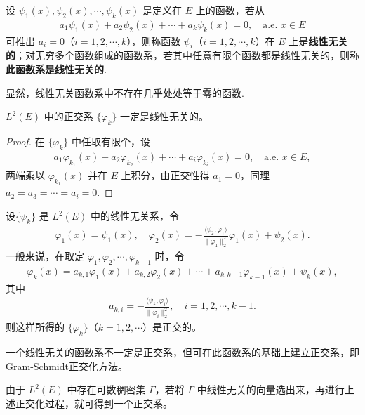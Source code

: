 \documentclass[../../main.tex]{subfiles}%
\begin{document}
\begin{definition}
设 $\psi_1(x), \psi_2(x), \cdots, \psi_k(x)$ 是定义在 $E$ 上的函数，若从
\begin{align*}
a_1 \psi_1(x) + a_2 \psi_2(x) + \cdots + a_k \psi_k(x) = 0, \quad \text{a.e. } x \in E
\end{align*}
可推出 $a_i = 0$（$i=1,2,\cdots,k$），则称函数 $\psi_i$（$i=1,2,\cdots,k$）在 $E$ 上是\textbf{线性无关的}；对无穷多个函数组成的函数系，若其中任意有限个函数都是线性无关的，则称\textbf{此函数系是线性无关的}.
\end{definition}
\begin{remark}
显然，线性无关函数系中不存在几乎处处等于零的函数.
\end{remark}

\begin{example}
$L^2(E)$ 中的正交系 $\{\varphi_k\}$ 一定是线性无关的。
\end{example}
\begin{proof}
在 $\{\varphi_k\}$ 中任取有限个，设
\begin{align*}
a_1 \varphi_{k_1}(x) + a_2 \varphi_{k_2}(x) + \cdots + a_i \varphi_{k_i}(x) = 0, \quad \text{a.e. } x \in E,
\end{align*}
两端乘以 $\varphi_{k_1}(x)$ 并在 $E$ 上积分，由正交性得 $a_1 = 0$，同理 $a_2 = a_3 = \cdots = a_i = 0$.
\end{proof}

\begin{theorem}
设$\{\psi_k\}$ 是 $L^2(E)$ 中的线性无关系，令
\begin{gather*}
\varphi_1(x) = \psi_1(x), \quad \varphi_2(x) = -\frac{\langle \psi_2, \varphi_1 \rangle}{\|\varphi_1\|_2^2} \varphi_1(x) + \psi_2(x).
\end{gather*}
一般来说，在取定 $\varphi_1, \varphi_2, \cdots, \varphi_{k-1}$ 时，令
\begin{gather*}
\varphi_k(x) = a_{k,1}\varphi_1(x) + a_{k,2}\varphi_2(x) + \cdots + a_{k,k-1}\varphi_{k-1}(x) + \psi_k(x),
\end{gather*}
其中
\begin{align*}
a_{k,i} = -\frac{\langle \psi_k, \varphi_i \rangle}{\|\varphi_i\|_2^2}, \quad i=1,2,\cdots,k-1.
\end{align*}
则这样所得的 $\{\varphi_k\}$（$k=1,2,\cdots$）是正交的。
\end{theorem}
\begin{remark}
一个线性无关的函数系不一定是正交系，但可在此函数系的基础上建立正交系，即Gram-Schmidt正交化方法。

由于 $L^2(E)$ 中存在可数稠密集 $\Gamma$，若将 $\Gamma$ 中线性无关的向量选出来，再进行上述正交化过程，就可得到一个正交系。
\end{remark}
\end{document}
